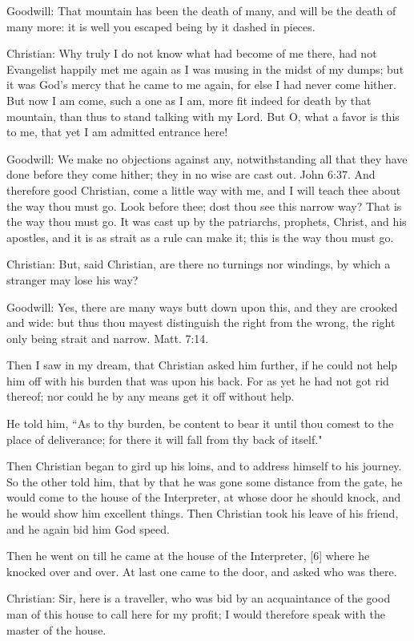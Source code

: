 Goodwill: That mountain has been the death of many, and will be the death of many more: it is well you escaped being by it dashed in pieces.

Christian: Why truly I do not know what had become of me there, had not Evangelist happily met me again as I was musing in the midst of my dumps; but it was God's mercy that he came to me again, for else I had never come hither. But now I am come, such a one as I am, more fit indeed for death by that mountain, than thus to stand talking with my Lord. But O, what a favor is this to me, that yet I am admitted entrance here!

Goodwill: We make no objections against any, notwithstanding all that they have done before they come hither; they in no wise are cast out. John 6:37. And therefore good Christian, come a little way with me, and I will teach thee about the way thou must go. Look before thee; dost thou see this narrow way? That is the way thou must go. It was cast up by the patriarchs, prophets, Christ, and his apostles, and it is as strait as a rule can make it; this is the way thou must go.

Christian: But, said Christian, are there no turnings nor windings, by which a stranger may lose his way?

Goodwill: Yes, there are many ways butt down upon this, and they are crooked and wide: but thus thou mayest distinguish the right from the wrong, the right only being strait and narrow. Matt. 7:14.

Then I saw in my dream, that Christian asked him further, if he could not help him off with his burden that was upon his back. For as yet he had not got rid thereof; nor could he by any means get it off without help.

He told him, ``As to thy burden, be content to bear it until thou comest to the place of deliverance; for there it will fall from thy back of itself."

Then Christian began to gird up his loins, and to address himself to his journey. So the other told him, that by that he was gone some distance from the gate, he would come to the house of the Interpreter, at whose door he should knock, and he would show him excellent things. Then Christian took his leave of his friend, and he again bid him God speed.

Then he went on till he came at the house of the Interpreter, [6] where he knocked over and over. At last one came to the door, and asked who was there.

Christian: Sir, here is a traveller, who was bid by an acquaintance of the good man of this house to call here for my profit; I would therefore speak with the master of the house.

